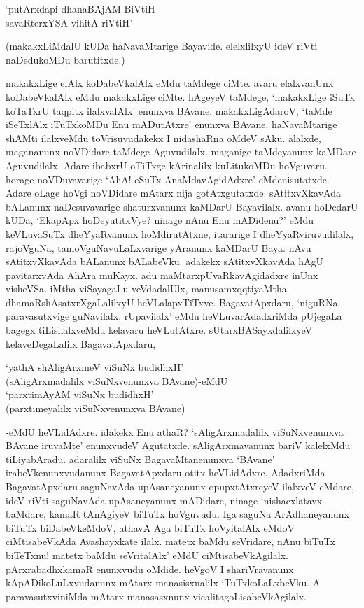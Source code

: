 \begin{shloka}
`putArxdapi dhanaBAjAM BiVtiH\\
savaRterxYSA vihitA riVtiH'
\end{shloka}

(makakxLiMdalU kUDa haNavaMtarige Bayavide. elelxlilxyU ideV riVti naDedukoMDu barutitxde.)

makakxLige elAlx koDabeVkalAlx eMdu taMdege ciMte. avaru elalxvanUnx koDabeVkalAlx eMdu makakxLige ciMte. hAgeyeV taMdege, `makakxLige iSuTx koTaTxrU taqpitx ilalxvalAlx' enunxva BAvane. makakxLigAdaroV, `taMde iSeTxlAlx iTuTxkoMDu Enu mADutAtxre' enunxva BAvane. haNavaMtarige shAMti ilalxveMdu toVrisuvudakekx I nidashaRna oMdeV sAku. alalxde, magananunx noVDidare taMdege Aguvudilalx. maganige taMdeyanunx kaMDare Aguvudilalx. Adare ibabxrU oTiTxge kArinalilx kuLitukoMDu hoVguvaru. horage noVDuvavarige `AhA! eSuTx AnaMdavAgidAdxre' eMdenisutatxde. Adare oLage hoVgi noVDidare mAtarx nija gotAtxgutatxde. sAtitxvXkavAda bALanunx naDesuvavarige shaturxvanunx kaMDarU Bayavilalx. avanu hoDedarU kUDa, `EkapApx hoDeyutitxVye? ninage nAnu Enu mADidenu?' eMdu keVLuvaSuTx dheYyaRvanunx hoMdirutAtxne, itararige I dheYyaRviruvudilalx, rajoVguNa, tamoVguNavuLaLxvarige yAranunx kaMDarU Baya. nAvu sAtitxvXkavAda bALanunx bALabeVku. adakekx sAtitxvXkavAda hAgU pavitarxvAda AhAra muKayx. adu maMtarxpUvaRkavAgidadxre inUnx visheVSa. iMtha viSayagaLu veVdadalUlx, manusamxqqtiyaMtha dhamaRshAsatxrXgaLalilxyU heVLalapxTiTxve. BagavatApxdaru, `niguRNa paravasutxvige guNavilalx, rUpavilalx' eMdu heVLuvarAdadxriMda pUjegaLa bagegx tiLisilalxveMdu kelavaru heVLutAtxre. sUtarxBASayxdalilxyeV kelaveDegaLalilx BagavatApxdaru,

\begin{shloka}
`yathA shAligArxmeV viSuNx budidhxH'\\
(sAligArxmadalilx viSuNxvenunxva BAvane)-eMdU\\
`parxtimAyAM viSuNx budidhxH'\\
(parxtimeyalilx viSuNxvenunxva BAvane)
\end{shloka}

-eMdU heVLidAdxre. idakekx Enu athaR? `sAligArxmadalilx viSuNxvenunxva BAvane iruvaMte' enunxvudeV Agutatxde. sAligArxmavanunx bariV kalelxMdu tiLiyabAradu. adaralilx viSuNx BagavaMtanenunxva `BAvane' irabeVkenunxvudanunx BagavatApxdaru otitx heVLidAdxre. AdadxriMda BagavatApxdaru saguNavAda upAsaneyanunx opupxtAtxreyeV ilalxveV eMdare, ideV riVti saguNavAda upAsaneyanunx mADidare, ninage `nishacxlatavx baMdare, kamaR tAnAgiyeV biTuTx hoVguvudu. Iga saguNa ArAdhaneyanunx biTuTx biDabeVkeMdoV, athavA Aga biTuTx hoVyitalAlx eMdoV ciMtisabeVkAda Avashayxkate ilalx. matetx baMdu seVridare, nAnu biTuTx biTeTxnu! matetx baMdu seVritalAlx' eMdU ciMtisabeVkAgilalx. pArxrabadhxkamaR enunxvudu oMdide. heVgoV I shariVravanunx kApADikoLuLxvudanunx mAtarx manasisxnalilx iTuTxkoLaLxbeVku. A paravasutxviniMda mAtarx manasasxnunx vicalitagoLisabeVkAgilalx.


